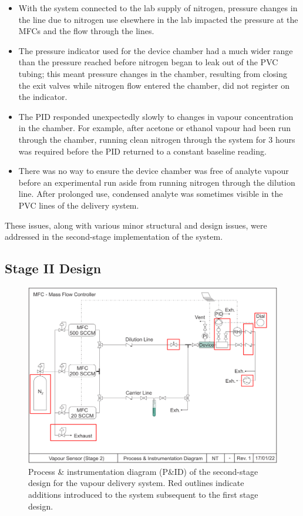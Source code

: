 \documentclass[
  a4paper,
]{scrbook}
\begin{document}
\begin{itemize}
\item
  With the system connected to the lab supply of nitrogen, pressure
  changes in the line due to nitrogen use elsewhere in the lab impacted
  the pressure at the MFCs and the flow through the lines.
\item
  The pressure indicator used for the device chamber had a much wider
  range than the pressure reached before nitrogen began to leak out of
  the PVC tubing; this meant pressure changes in the chamber, resulting
  from closing the exit valves while nitrogen flow entered the chamber,
  did not register on the indicator.
\item
  The PID responded unexpectedly slowly to changes in vapour
  concentration in the chamber. For example, after acetone or ethanol
  vapour had been run through the chamber, running clean nitrogen
  through the system for 3 hours was required before the PID returned to
  a constant baseline reading.
\item
  There was no way to ensure the device chamber was free of analyte
  vapour before an experimental run aside from running nitrogen through
  the dilution line. After prolonged use, condensed analyte was
  sometimes visible in the PVC lines of the delivery system.
\end{itemize}

These issues, along with various minor structural and design issues,
were addressed in the second-stage implementation of the system.

\hypertarget{stage-ii-design}{%
\subsection{Stage II Design}\label{stage-ii-design}}

\begin{figure}

{\centering \includegraphics[width=1\textwidth,height=\textheight]{figures/ch5/PID_V2.png}

}

\caption{\label{fig-stage-2-pid}Process \& instrumentation diagram
(P\&ID) of the second-stage design for the vapour delivery system. Red
outlines indicate additions introduced to the system subsequent to the
first stage design.}

\end{figure}
\end{document}
